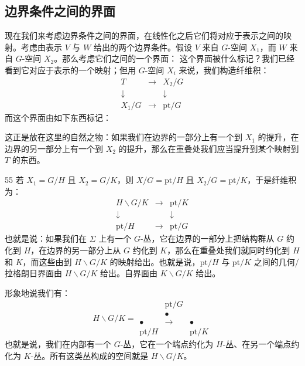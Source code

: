 \subsection{边界条件之间的界面}\label{sec:10-5-1}

现在我们来考虑边界条件之间的界面，在线性化之后它们将对应于表示之间的映射。考虑由表示 $V$ 与 $W$ 给出的两个边界条件。假设 $V$ 来自 $G$-空间 $X_1$，而 $W$ 来自 $G$-空间 $X_2$。那么考虑它们之间的一个界面：
这个界面被什么标记？我们已经看到它对应于表示的一个映射；但用 $G$-空间 $X_i$ 来说，我们构造纤维积：
\begin{equation}\tag{10.67}
\begin{array}{ccc}
T & \longrightarrow & X_2/G\\[4pt]
\downarrow & & \downarrow\\[4pt]
X_1/G & \longrightarrow & \mathrm{pt}/G
\end{array}
\end{equation}
而这个界面由如下东西标记：

这正是放在这里的自然之物：如果我们在边界的一部分上有一个到 $X_1$ 的提升，在边界的另一部分上有一个到 $X_2$ 的提升，那么在重叠处我们应当提升到某个映射到 $T$ 的东西。

\begin{srcex}{55}
若 $X_1=G/H$ 且 $X_2=G/K$，则 $X/G=\mathrm{pt}/H$ 且 $X_2/G=\mathrm{pt}/K$，于是纤维积为：
\begin{equation}\tag{10.69}
\begin{array}{ccc}
H\backslash G/K & \longrightarrow & \mathrm{pt}/K\\[4pt]
\downarrow & & \downarrow\\[4pt]
\mathrm{pt}/H & \longrightarrow & \mathrm{pt}/G
\end{array}
\end{equation}
也就是说：如果我们在 $\Sigma$ 上有一个 $G$-丛，它在边界的一部分上把结构群从 $G$ 约化到 $H$，在边界的另一部分上从 $G$ 约化到 $K$，那么在重叠处我们就同时约化到 $H$ 和 $K$，而这些由到 $H\backslash G/K$ 的映射给出。也就是说，$\mathrm{pt}/H$ 与 $\mathrm{pt}/K$ 之间的几何/拉格朗日界面由 $H\backslash G/K$ 给出。自界面由 $K\backslash G/K$ 给出。

形象地说我们有：
\begin{equation}\tag{10.70}
H\backslash G/K=\begin{array}{ccc}
& \mathrm{pt}/G &\\[-5pt]
& \bullet &\\[3pt]
\bullet & \longrightarrow & \bullet\\[-6pt]
\mathrm{pt}/H & & \mathrm{pt}/K
\end{array}
\end{equation}
也就是说，我们在内部有一个 $G$-丛，它在一个端点约化为 $H$-丛、在另一个端点约化为 $K$-丛。所有这类丛构成的空间就是 $H\backslash G/K$。
\end{srcex}

